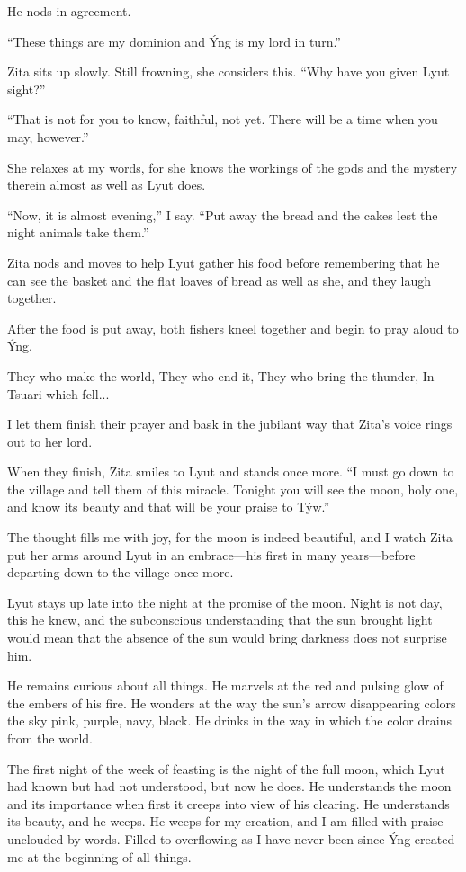 He nods in agreement.

``These things are my dominion and Ýng is my lord in turn.''

Zita sits up slowly. Still frowning, she considers this. ``Why have you given Lyut sight?''

``That is not for you to know, faithful, not yet. There will be a time when you may, however.''

She relaxes at my words, for she knows the workings of the gods and the mystery therein almost as well as Lyut does.

``Now, it is almost evening,'' I say. ``Put away the bread and the cakes lest the night animals take them.''

Zita nods and moves to help Lyut gather his food before remembering that he can see the basket and the flat loaves of bread as well as she, and they laugh together.

After the food is put away, both fishers kneel together and begin to pray aloud to Ýng.

They who make the world, They who end it, They who bring the thunder, In Tsuari which fell...

I let them finish their prayer and bask in the jubilant way that Zita's voice rings out to her lord.

When they finish, Zita smiles to Lyut and stands once more. ``I must go down to the village and tell them of this miracle. Tonight you will see the moon, holy one, and know its beauty and that will be your praise to Týw.''

The thought fills me with joy, for the moon is indeed beautiful, and I watch Zita put her arms around Lyut in an embrace---his first in many years---before departing down to the village once more.

\secdiv

\noindent Lyut stays up late into the night at the promise of the moon. Night is not day, this he knew, and the subconscious understanding that the sun brought light would mean that the absence of the sun would bring darkness does not surprise him.

He remains curious about all things. He marvels at the red and pulsing glow of the embers of his fire. He wonders at the way the sun's arrow disappearing colors the sky pink, purple, navy, black. He drinks in the way in which the color drains from the world.

The first night of the week of feasting is the night of the full moon, which Lyut had known but had not understood, but now he does. He understands the moon and its importance when first it creeps into view of his clearing. He understands its beauty, and he weeps. He weeps for my creation, and I am filled with praise unclouded by words. Filled to overflowing as I have never been since Ýng created me at the beginning of all things.

